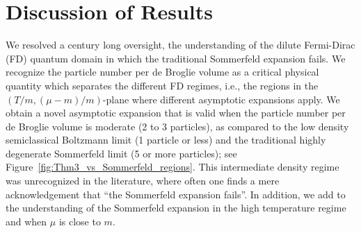 \documentclass[sn-mathphys,Numbered]{sn-jnl}
\newcommand{\rf}[1]{Figure~{\ref{#1}}}
\begin{document}
\section{Discussion of Results}
\label{sec:final}
We resolved a century long oversight, the understanding of the dilute Fermi-Dirac (FD) quantum domain in which the traditional Sommerfeld expansion fails. We recognize the particle number per de Broglie volume as a critical physical quantity which separates the different FD regimes, i.e., the regions in the $(T/m,(\mu-m)/m)$-plane where different asymptotic expansions apply. We obtain a novel asymptotic expansion that is valid when the particle number per de Broglie volume is moderate (2 to 3 particles), as compared to the low density semiclassical Boltzmann limit (1 particle or less) and the traditional highly degenerate Sommerfeld limit (5 or more particles); see \rf{fig:Thm3_vs_Sommerfeld_regions}. This intermediate density regime was unrecognized in the literature, where often one finds a mere acknowledgement that ``the Sommerfeld expansion fails''. In addition, we add to the understanding of the Sommerfeld expansion in the high temperature regime and when $\mu$ is close to $m$.
\end{document}
